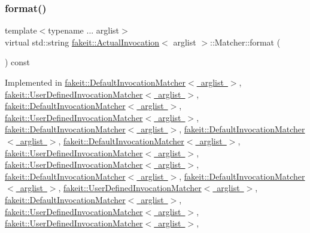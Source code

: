 \subsubsection{\texorpdfstring{format()}{format()}\hspace{0.1cm}{\footnotesize\ttfamily [1/9]}}
{\footnotesize\ttfamily template$<$typename ... arglist$>$ \\
virtual std\+::string \mbox{\hyperlink{structfakeit_1_1ActualInvocation}{fakeit\+::\+Actual\+Invocation}}$<$ arglist $>$\+::Matcher\+::format (\begin{DoxyParamCaption}{ }\end{DoxyParamCaption}) const\hspace{0.3cm}{\ttfamily [pure virtual]}}



Implemented in \mbox{\hyperlink{structfakeit_1_1DefaultInvocationMatcher_a056fc7516e51e5eb15831359cb376fef}{fakeit\+::\+Default\+Invocation\+Matcher$<$ arglist $>$}}, \mbox{\hyperlink{structfakeit_1_1UserDefinedInvocationMatcher_a8090f8ab0af9c775f833e725f4414368}{fakeit\+::\+User\+Defined\+Invocation\+Matcher$<$ arglist $>$}}, \mbox{\hyperlink{structfakeit_1_1DefaultInvocationMatcher_a056fc7516e51e5eb15831359cb376fef}{fakeit\+::\+Default\+Invocation\+Matcher$<$ arglist $>$}}, \mbox{\hyperlink{structfakeit_1_1UserDefinedInvocationMatcher_a8090f8ab0af9c775f833e725f4414368}{fakeit\+::\+User\+Defined\+Invocation\+Matcher$<$ arglist $>$}}, \mbox{\hyperlink{structfakeit_1_1DefaultInvocationMatcher_a056fc7516e51e5eb15831359cb376fef}{fakeit\+::\+Default\+Invocation\+Matcher$<$ arglist $>$}}, \mbox{\hyperlink{structfakeit_1_1DefaultInvocationMatcher_a056fc7516e51e5eb15831359cb376fef}{fakeit\+::\+Default\+Invocation\+Matcher$<$ arglist $>$}}, \mbox{\hyperlink{structfakeit_1_1DefaultInvocationMatcher_a056fc7516e51e5eb15831359cb376fef}{fakeit\+::\+Default\+Invocation\+Matcher$<$ arglist $>$}}, \mbox{\hyperlink{structfakeit_1_1UserDefinedInvocationMatcher_a8090f8ab0af9c775f833e725f4414368}{fakeit\+::\+User\+Defined\+Invocation\+Matcher$<$ arglist $>$}}, \mbox{\hyperlink{structfakeit_1_1UserDefinedInvocationMatcher_a8090f8ab0af9c775f833e725f4414368}{fakeit\+::\+User\+Defined\+Invocation\+Matcher$<$ arglist $>$}}, \mbox{\hyperlink{structfakeit_1_1DefaultInvocationMatcher_a056fc7516e51e5eb15831359cb376fef}{fakeit\+::\+Default\+Invocation\+Matcher$<$ arglist $>$}}, \mbox{\hyperlink{structfakeit_1_1DefaultInvocationMatcher_a056fc7516e51e5eb15831359cb376fef}{fakeit\+::\+Default\+Invocation\+Matcher$<$ arglist $>$}}, \mbox{\hyperlink{structfakeit_1_1UserDefinedInvocationMatcher_a8090f8ab0af9c775f833e725f4414368}{fakeit\+::\+User\+Defined\+Invocation\+Matcher$<$ arglist $>$}}, \mbox{\hyperlink{structfakeit_1_1DefaultInvocationMatcher_a056fc7516e51e5eb15831359cb376fef}{fakeit\+::\+Default\+Invocation\+Matcher$<$ arglist $>$}}, \mbox{\hyperlink{structfakeit_1_1UserDefinedInvocationMatcher_a8090f8ab0af9c775f833e725f4414368}{fakeit\+::\+User\+Defined\+Invocation\+Matcher$<$ arglist $>$}}, \mbox{\hyperlink{structfakeit_1_1UserDefinedInvocationMatcher_a8090f8ab0af9c775f833e725f4414368}{fakeit\+::\+User\+Defined\+Invocation\+Matcher$<$ arglist $>$}}, 